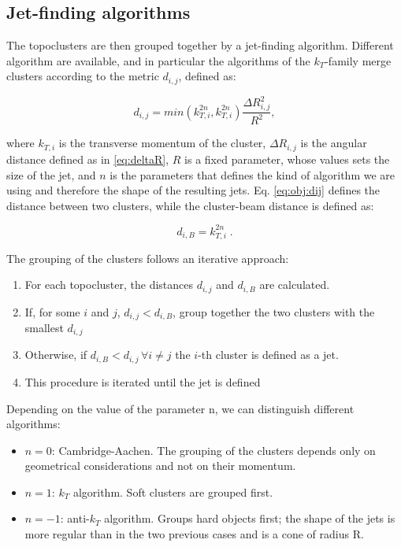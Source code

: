 \subsection{Jet-finding algorithms}
\label{sec:obj:jetfinding}

The topoclusters are then grouped together by a jet-finding algorithm. Different algorithm are available, and in particular the algorithms of the $k_T$-family merge clusters according to the metric $d_{i,j}$, defined as:

\begin{equation}
d_{i,j} = min\left( k_{T,i}^{2n}, k_{T,i}^{2n}  \right) \frac{\Delta R_{i,j}^2}{R^2},
\label{eq:obj:dij}
\end{equation}

\noindent where $k_{T,i}$ is the transverse momentum of the cluster, $\Delta R_{i,j}$ is the angular distance defined as in \ref{eq:deltaR}, $R$ is a fixed parameter, whose values sets the size of the jet, and $n$ is the parameters that defines the kind of algorithm we are using and therefore the shape of the resulting jets. Eq. \ref{eq:obj:dij} defines the distance between two clusters, while the cluster-beam distance is defined as:

\begin{equation}
d_{i,B} =  k_{T,i}^{2n} \; .
\end{equation}

The grouping of the clusters follows an iterative approach:
\begin{enumerate}
\item For each topocluster, the distances $d_{i,j}$ and $d_{i,B}$ are calculated.
\item If, for some $i$ and $j$, $d_{i,j} < d_{i,B}$, group together the two clusters with the smallest $d_{i,j}$
\item Otherwise, if $d_{i,B} < d_{i,j} \, \forall i \neq j $ the $i$-th cluster is defined as a jet.
\item This procedure is iterated until the jet is defined
\end{enumerate}

\noindent Depending on the value of the parameter n, we can distinguish different algorithms:
\begin{itemize}
\item $n=0$: Cambridge-Aachen. The grouping of the clusters depends only on geometrical considerations and not on their momentum. 
\item $n=1$: $k_T$ algorithm. Soft clusters are grouped first.
\item $n=-1$: anti-$k_T$ algorithm. Groups hard objects first; the shape of the jets is more regular than in the two previous cases and is a cone of radius R.
\end{itemize}

